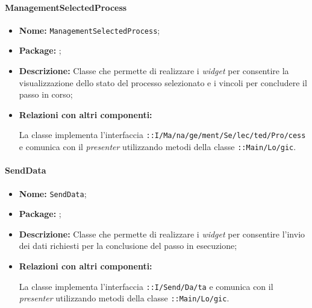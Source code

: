 \paragraph{ManagementSelectedProcess}
\begin{flushleft}
\begin{itemize}
\item \textbf{Nome:} \texttt{ManagementSelectedProcess};
\item \textbf{Package:} \texttt{\viewUser{}};
\item \textbf{Descrizione:} Classe che permette di realizzare i \textit{widget} per consentire la visualizzazione dello stato del processo selezionato e i vincoli per concludere il passo in corso;
\item \textbf{Relazioni con altri componenti:}
\begin{sloppypar}
La classe implementa l'interfaccia \texttt{\iViewUser{}::I\fshyp{}Ma\fshyp{}na\fshyp{}ge\fshyp{}ment\fshyp{}Se\fshyp{}lec\fshyp{}ted\fshyp{}Pro\fshyp{}cess} e comunica con il \textit{presenter} utilizzando metodi della classe \texttt{\logicUser{}::Main\fshyp{}Lo\fshyp{}gic}.
\end{sloppypar}
\end{itemize}
\end{flushleft}

\paragraph{SendData}
\begin{flushleft}
\begin{itemize}
\item \textbf{Nome:} \texttt{SendData};
\item \textbf{Package:} \texttt{\viewUser{}};
\item \textbf{Descrizione:} Classe che permette di realizzare i \textit{widget} per consentire l'invio dei dati richiesti per la conclusione del passo in esecuzione;
\item \textbf{Relazioni con altri componenti:}
\begin{sloppypar}
La classe implementa l'interfaccia \texttt{\iViewUser{}::I\fshyp{}Send\fshyp{}Da\fshyp{}ta} e comunica con il \textit{presenter} utilizzando metodi della classe \texttt{\logicUser{}::Main\fshyp{}Lo\fshyp{}gic}.
\end{sloppypar}
\end{itemize}
\end{flushleft}

